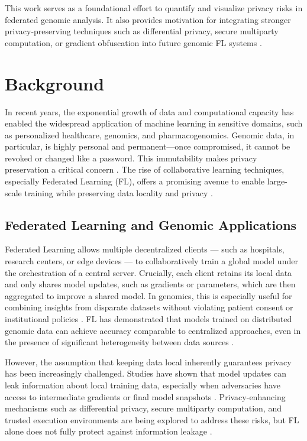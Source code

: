 \documentclass[conference]{IEEEtran}
\begin{document}
This work serves as a foundational effort to quantify and visualize privacy risks in federated genomic analysis. It also provides motivation for integrating stronger privacy-preserving techniques such as differential privacy, secure multiparty computation, or gradient obfuscation into future genomic FL systems \cite{liu2023recentadvances1}\cite{chai2024survey2}\cite{Yin2021comprehensive9}.

\section{Background}
In recent years, the exponential growth of data and computational capacity has enabled the widespread application of machine learning in sensitive domains, such as personalized healthcare, genomics, and pharmacogenomics. Genomic data, in particular, is highly personal and permanent—once compromised, it cannot be revoked or changed like a password. This immutability makes privacy preservation a critical concern \cite{raimondi2023genome14}. The rise of collaborative learning techniques, especially Federated Learning (FL), offers a promising avenue to enable large-scale training while preserving data locality and privacy \cite{casaletto2023federated13}.

\subsection{Federated Learning and Genomic Applications}
Federated Learning allows multiple decentralized clients — such as hospitals, research centers, or edge devices — to collaboratively train a global model under the orchestration of a central server. Crucially, each client retains its local data and only shares model updates, such as gradients or parameters, which are then aggregated to improve a shared model. In genomics, this is especially useful for combining insights from disparate datasets without violating patient consent or institutional policies \cite{raimondi2023genome14}. FL has demonstrated that models trained on distributed genomic data can achieve accuracy comparable to centralized approaches, even in the presence of significant heterogeneity between data sources \cite{efficacy2024offederated10}.

However, the assumption that keeping data local inherently guarantees privacy has been increasingly challenged. Studies have shown that model updates can leak information about local training data, especially when adversaries have access to intermediate gradients or final model snapshots \cite{nguyen2023active11}. Privacy-enhancing mechanisms such as differential privacy, secure multiparty computation, and trusted execution environments are being explored to address these risks, but FL alone does not fully protect against information leakage \cite{casaletto2023federated13} \cite{raimondi2023genome14} \cite{koutsoubis2024privacy15}.
\end{document}
